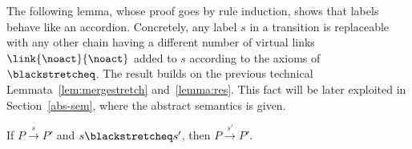 \begin{example}

\end{example}

The following lemma, whose proof goes by rule induction, shows that labels behave like an accordion.
Concretely, any label $s$ in a transition is replaceable with any other chain having a different number of virtual links $\link{\noact}{\noact}$ added to $s$ according to the axioms of $\blackstretcheq$. 
The result builds on the previous technical Lemmata~\ref{lem:mergestretch} and~\ref{lemma:res}.
This fact will be later exploited in Section~\ref{abs-sem}, where the abstract semantics is given.



\begin{lemma}\label{lem:stretchlts}
If $P\xrightarrow{s} P'$ and $s \blackstretcheq s'$,
then $P\xrightarrow{s'} P'$.
\end{lemma}




